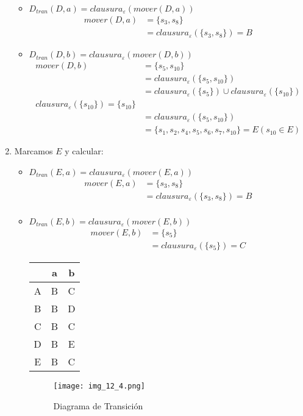 \begin{enumerate}
	\begin{itemize}
	\item $D_{tran}(D,a)=clausura_\varepsilon(mover(D,a))$
	\begin{align*}
	mover(D,a)	&=\{s_3,s_8\}	\\
				&=clausura_\varepsilon(\{s_3,s_8\})=B
	\end{align*}
	\item $D_{tran}(D,b)=clausura_\varepsilon(mover(D,b))$
	\begin{align*}
	mover(D,b)	&=\{s_5,s_{10}\}	\\
				&=clausura_\varepsilon(\{s_5,s_{10}\})	\\
				&=clausura_\varepsilon(\{s_5\})\cup clausura_\varepsilon(\{s_{10}\})	\\
	clausura_\varepsilon(\{s_{10}\})=\{s_{10}\}	\\
				&=clausura_\varepsilon(\{s_5,s_{10}\})	\\
				&=\{s_1,s_2,s_4,s_5,s_6,s_7,s_{10}\}=E	(s_{10}\in E)
	\end{align*}
	\end{itemize}
\item Marcamos $E$ y calcular:
	\begin{itemize}
	\item $D_{tran}(E,a)=clausura_\varepsilon(mover(E,a))$
	\begin{align*}
	mover(E,a)	&=\{s_3,s_8\}	\\
				&=clausura_\varepsilon(\{s_3,s_8\})=B	\\
	\end{align*}
	\item $D_{tran}(E,b)=clausura_\varepsilon(mover(E,b))$
	\begin{align*}
	mover(E,b)	&=\{s_5\}	\\
				&=clausura_\varepsilon(\{s_5\})=C
	\end{align*}
	\begin{center}
	\begin{tabular}{c|cc}
		&a	&b	\\ \hline
	A	&B	&C	\\
	B	&B	&D	\\
	C	&B	&C	\\
	D	&B	&E	\\
	E	&B	&C	
	\end{tabular}
	\end{center}
	\begin{figure}[h!]
	\centering
	\texttt{[image: img\_12\_4.png]}
	\caption{Diagrama de Transición}\label{img_12_4}
	\end{figure}
	\end{itemize}
\end{enumerate}